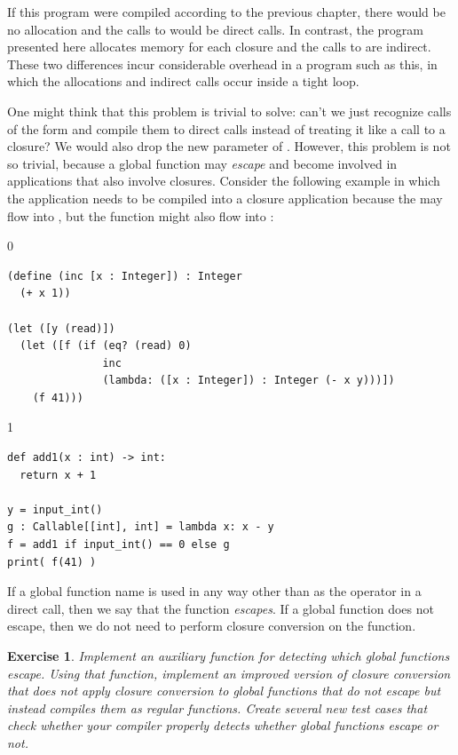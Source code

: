 \documentclass[7x10]{TimesAPriori_MIT}%
\def\racketEd{0}
\def\pythonEd{1}
\def\edition{1}
\newcommand{\pythonColor}[0]{}
\newtheorem{exercise}[theorem]{Exercise}
\numberwithin{theorem}{chapter}
\numberwithin{definition}{chapter}
\numberwithin{equation}{chapter}
\begin{document}
If this program were compiled according to the previous chapter, there
would be no allocation and the calls to  would be
direct calls. In contrast, the program presented here allocates memory
for each closure and the calls to  are indirect. These
two differences incur considerable overhead in a program such as this,
in which the allocations and indirect calls occur inside a tight loop.

One might think that this problem is trivial to solve: can't we just
recognize calls of the form 
and compile them to direct calls instead of treating it like a call to
a closure? We would also drop the new  parameter of
.
%
However, this problem is not so trivial, because a global function may
\emph{escape} and become involved in applications that also involve
closures. Consider the following example in which the application
 needs to be compiled into a closure
application because the  may flow into , but the
 function might also flow into :
\begin{center}
\begin{minipage}{\textwidth}
{\if\edition\racketEd  
\begin{lstlisting}
(define (inc [x : Integer]) : Integer
  (+ x 1))

(let ([y (read)])
  (let ([f (if (eq? (read) 0)
               inc
               (lambda: ([x : Integer]) : Integer (- x y)))])
    (f 41)))
\end{lstlisting}
\fi}
{\if\edition\pythonEd\pythonColor  
\begin{lstlisting}
def add1(x : int) -> int:
  return x + 1

y = input_int()
g : Callable[[int], int] = lambda x: x - y
f = add1 if input_int() == 0 else g
print( f(41) )
\end{lstlisting}
\fi}
\end{minipage}
\end{center}
If a global function name is used in any way other than as the
operator in a direct call, then we say that the function
\emph{escapes}. If a global function does not escape, then we do not
need to perform closure conversion on the function.

\begin{exercise}\normalfont\normalsize
  Implement an auxiliary function for detecting which global
  functions escape. Using that function, implement an improved version
  of closure conversion that does not apply closure conversion to
  global functions that do not escape but instead compiles them as
  regular functions. Create several new test cases that check whether
  your compiler properly detects whether global functions escape or not.
\end{exercise}
\end{document}
